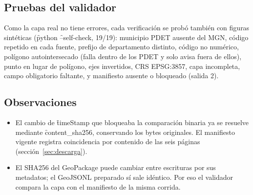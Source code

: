 \subsection{Pruebas del validador}

Como la capa real no tiene errores, cada verificación se probó también con figuras sintéticas (\f{python}  \f{--self-check}, 19/19): municipio PDET ausente del MGN, código repetido en cada fuente, prefijo de departamento distinto, código no numérico, polígono autointersecado (falla dentro de los PDET y solo avisa fuera de ellos), punto en lugar de polígono, ejes invertidos, CRS EPSG:3857, capa incompleta, campo obligatorio faltante, y manifiesto ausente o bloqueado (salida 2).

\subsection{Observaciones}

\begin{itemize}
  \item El cambio de \f{timeStamp} que bloqueaba la comparación binaria ya se resuelve mediante \f{content\_sha256}, conservando los bytes originales. El manifiesto vigente registra coincidencia por contenido de las seis páginas (sección~\ref{sec:descarga}).
  \item El SHA256 del GeoPackage puede cambiar entre escrituras por sus metadatos; el GeoJSONL preparado sí sale idéntico. Por eso el validador compara la capa con el manifiesto de la misma corrida.
\end{itemize}
